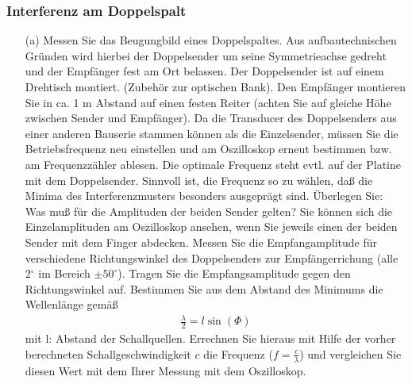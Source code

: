 \documentclass[12pt]{scrartcl}
\begin{document}
\subsubsection{Interferenz am Doppelspalt}
\begin{itemize}
\item[(a)]
Messen Sie das Beugungbild eines Doppelspaltes. Aus aufbautechnischen Gründen wird hierbei der Doppelsender um seine Symmetrieachse gedreht und der Empfänger fest am Ort belassen. Der Doppelsender ist auf einem Drehtisch montiert. (Zubehör zur optischen Bank). Den Empfänger montieren Sie
in ca. 1 m Abstand auf einen festen Reiter (achten Sie auf gleiche Höhe zwischen Sender und Empfänger). Da die Transducer des Doppelsenders aus einer anderen Bauserie stammen können als die Einzelsender, müssen Sie die Betriebsfrequenz neu einstellen und am Oszilloskop erneut bestimmen bzw. am Frequenzzähler ablesen. Die optimale Frequenz steht evtl. auf der Platine mit dem Doppelsender. Sinnvoll ist, die Frequenz so zu wählen, daß die Minima des Interferenzmusters
besonders ausgeprägt sind. Überlegen Sie: Was muß für die Amplituden der beiden Sender gelten? Sie können sich die Einzelamplituden am Oszilloskop ansehen, wenn Sie jeweils einen der beiden Sender mit dem Finger abdecken.
Messen Sie die Empfangamplitude für verschiedene Richtungswinkel des Doppelsenders zur Empfängerrichung (alle 2$^{\circ}$ im Bereich $\pm 50^{\circ}$). Tragen Sie die Empfangsamplitude gegen den Richtungswinkel auf. Bestimmen Sie aus dem Abstand des Minimums die Wellenlänge gemäß
\begin{align}
\frac{\lambda}{2} = l\sin(\Phi)
\end{align}
mit l: Abstand der Schallquellen.
Errechnen Sie hieraus mit Hilfe der vorher berechneten Schallgeschwindigkeit $c$ die Frequenz ($f = \frac{c}{\lambda}$) und vergleichen Sie diesen Wert mit dem Ihrer Messung mit dem Oszilloskop.
\end{itemize}
\end{document}
